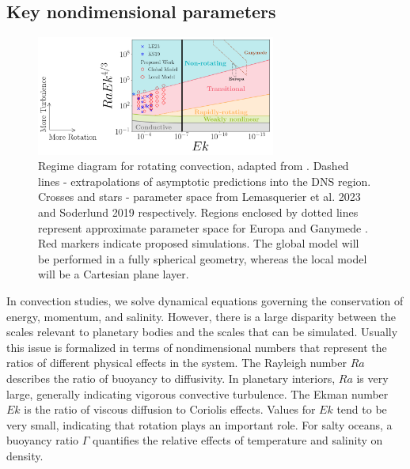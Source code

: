 \documentclass[12pt]{article}
\begin{document}
\subsection{Key nondimensional parameters}
\begin{figure}
	\begin{center}
		\includegraphics[width=0.7\textwidth]{figures/reg_diagram}
		\phantom{Lorem ipsum dolor sit amet}
	\end{center}
	\caption{Regime diagram for rotating convection, adapted from \citep{dL23,tG16}. Dashed lines - extrapolations of asymptotic predictions into the DNS region. Crosses and stars - parameter space from Lemasquerier et al. 2023\citep{dL23} and Soderlund 2019\citep{kS19} respectively. Regions enclosed by dotted lines represent approximate parameter space for Europa and Ganymede \citep{dL23,kS19}. Red markers indicate proposed simulations. The global model will be performed in a fully spherical geometry, whereas the local model will be a Cartesian plane layer.
	}
	\label{f:reg_d}
\end{figure}
In convection studies, we solve dynamical equations governing the conservation of energy, momentum, and salinity. However, there is a large disparity between the scales relevant to planetary bodies and the scales that can be simulated. 
Usually this issue is formalized in terms of nondimensional numbers that represent the ratios of different physical effects in the system. %
The Rayleigh number $Ra$ describes the ratio of buoyancy to diffusivity. In planetary interiors, $Ra$ is very large, generally indicating vigorous convective turbulence.
The Ekman number $Ek$ is the ratio of viscous diffusion to Coriolis effects. Values for $Ek$ tend to be very small, indicating that rotation plays an important role.
For salty oceans, a buoyancy ratio $\Gamma$ quantifies the relative effects of temperature and salinity on density.
\end{document}

